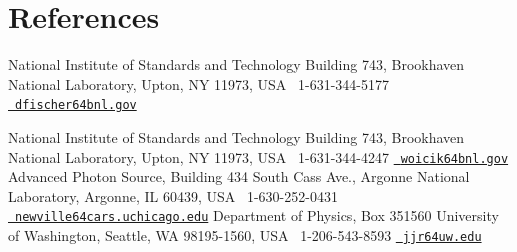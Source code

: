 \documentclass[11pt]{moderncv}
\begin{document}
\section{References}
%
{National Institute of Standards and Technology\newline
  Building 743, Brookhaven National Laboratory, Upton, NY 11973, USA\newline
  \phonesymbol\ 1-631-344-5177\quad
  \href{mailto:dfischer@bnl.gov}{\emailsymbol\ \footnotesize\texttt{dfischer\char64bnl.gov}}}

%
{National Institute of Standards and Technology\newline
  Building 743, Brookhaven National Laboratory, Upton, NY 11973, USA\newline
  \phonesymbol\ 1-631-344-4247\quad
  \href{mailto:woicik@bnl.gov}{\emailsymbol\ \footnotesize\texttt{woicik\char64bnl.gov}}}
%
{Advanced Photon Source, Building 434 South Cass Ave., Argonne National Laboratory, Argonne, IL 60439, USA\newline
  \phonesymbol\ 1-630-252-0431\quad
  \href{mailto:newville@cars.uchicago.edu}
  {\emailsymbol\ \footnotesize\texttt{newville\char64cars.uchicago.edu}}}
%
{Department of Physics, Box 351560\newline
  University of Washington, Seattle, WA 98195-1560, USA\newline
  \phonesymbol\ 1-206-543-8593\quad
  \href{mailto:jjr@uw.edu}{\emailsymbol\ \footnotesize\texttt{jjr\char64uw.edu}}}
\end{document}
